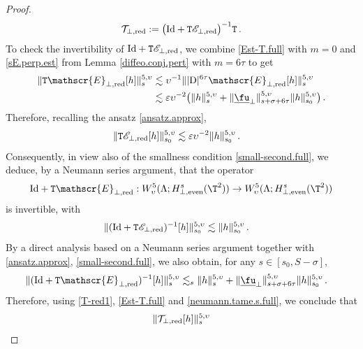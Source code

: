 \documentclass[a4paper,reqno,10pt]{article}
\newcommand{\sE}{\mathscr{E}}
\begin{document}
\begin{proof}
\begin{align}\label{T-red1}
\mathcal{T}_{\perp,{\rm red}}:=\big({\rm Id}+\mathtt{T}  \sE_{\perp,{\rm red}}\big)^{-1}\mathtt{T}\,.
\end{align}
To check the invertibility of ${\rm Id}+\mathtt{T}  \sE_{\perp,{\rm red}} $, we combine \eqref{Est-T.full} with $m=0$ and \eqref{sE.perp.est} from Lemma \ref{diffeo.conj.pert} with $m=6\tau$ to get
\begin{align*}
		\| \mathtt{T}   \sE_{\perp,{\rm red}} [h]  \|_{s}^{5,\upsilon} & \lesssim  \upsilon^{-1}\||{\rm D}|^{6\tau}  \sE_{\perp,{\rm red}}  [h]\|_{s}^{5,\upsilon}\\
        &\lesssim \varepsilon\upsilon^{-2} \big( \| h\|_{s}^{5,\upsilon}  + \| \underline{\fu}_{\perp}\|_{s+\sigma+6\tau}^{5,\upsilon} \|  h \|_{s_0}^{5,\upsilon}  \big)  \,.  
	\end{align*}
    Therefore, recalling the ansatz \eqref{ansatz.approx},
    \begin{align*}
		\| \mathtt{T}  \sE_{\perp,{\rm red}} [h]  \|_{s_0}^{5,\upsilon} 
        &\lesssim \varepsilon\upsilon^{-2}  \| h\|_{s_0}^{5,\upsilon}\,.
	\end{align*}
    Consequently, in view also of  the smallness condition \eqref{small-second.full}, we deduce, by a Neumann series argument, that the operator
\begin{equation}
    {\rm Id}+\mathtt{T}  \sE_{\perp,{\rm red}}  :W_\upsilon^5(\Lambda;H^s_{\perp,{\rm even}}(\T^2))\to {W_\upsilon^5(\Lambda;H^s_{\perp,{\rm even}}(\T^2))}
\end{equation}
is invertible, with
    \begin{align*}
		\| ({\rm Id}+\mathtt{T}  \sE_{\perp,{\rm red}})^{-1}[h]  \|_{s_0}^{5,\upsilon} 
        &\lesssim   \| h\|_{s_0}^{5,\upsilon}\,.
	\end{align*}
By a direct analysis based on a Neumann series argument together with \eqref{ansatz.approx}, \eqref{small-second.full}, we also obtain, for any $s\in [s_0,S-\sigma]$,
\begin{align}\label{neumann.tame.s.full}
		\| ({\rm Id}+\mathtt{T}  \sE_{\perp,{\rm red}})^{-1}[h]  \|_{s}^{5,\upsilon} 
        &\lesssim_{s}   \| h\|_{s}^{5,\upsilon} + \| \underline{\fu}_{\perp}\|_{s+\sigma+6\tau}^{5,\upsilon} \|  h \|_{s_0}^{5,\upsilon}\,.
	\end{align}
    Therefore, using \eqref{T-red1}, \eqref{Est-T.full} and \eqref{neumann.tame.s.full}, we conclude that 
    \begin{align}\label{T-EqP}
		\| \mathcal{T}_{\perp,{\rm red}}[h]  \|_{s}^{5,\upsilon} 

\end{align}
\end{proof}
\end{document}
